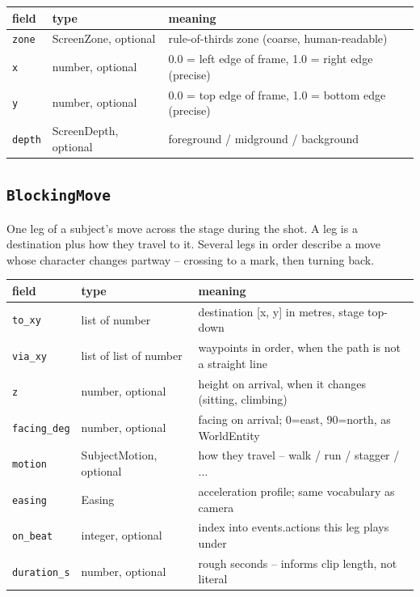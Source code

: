 \begin{longtable}{@{}R{0.24\textwidth}R{0.21\textwidth}R{0.49\textwidth}@{}}
\toprule \textbf{field} & \textbf{type} & \textbf{meaning} \\ \midrule
\endhead
\texttt{zone} & ScreenZone, optional & rule-of-thirds zone (coarse, human-readable) \\
\texttt{x} & number, optional & 0.0 = left edge of frame, 1.0 = right edge (precise) \\
\texttt{y} & number, optional & 0.0 = top edge of frame, 1.0 = bottom edge (precise) \\
\texttt{depth} & ScreenDepth, optional & foreground /\allowbreak{} midground /\allowbreak{} background \\
\bottomrule
\end{longtable}

\subsection*{\texttt{BlockingMove}}
\noindent One leg of a subject's move across the stage during the shot. A leg is a destination plus how they travel to it. Several legs in order describe a move whose character changes partway -- crossing to a mark, then turning back.

\begin{longtable}{@{}R{0.24\textwidth}R{0.21\textwidth}R{0.49\textwidth}@{}}
\toprule \textbf{field} & \textbf{type} & \textbf{meaning} \\ \midrule
\endhead
\texttt{to\_\allowbreak xy} & list of number & destination [x, y] in metres, stage top-down \\
\texttt{via\_\allowbreak xy} & list of list of number & waypoints in order, when the path is not a straight line \\
\texttt{z} & number, optional & height on arrival, when it changes (sitting, climbing) \\
\texttt{facing\_\allowbreak deg} & number, optional & facing on arrival; 0=east, 90=north, as WorldEntity \\
\texttt{motion} & SubjectMotion, optional & how they travel -- walk /\allowbreak{} run /\allowbreak{} stagger /\allowbreak{} ... \\
\texttt{easing} & Easing & acceleration profile; same vocabulary as camera \\
\texttt{on\_\allowbreak beat} & integer, optional & index into events.actions this leg plays under \\
\texttt{duration\_\allowbreak s} & number, optional & rough seconds -- informs clip length, not literal \\
\bottomrule
\end{longtable}

